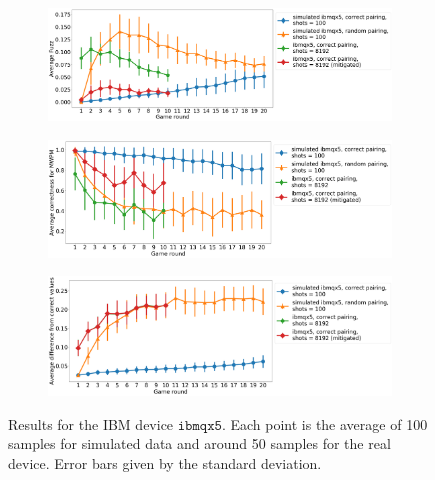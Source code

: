 \documentclass[aps,prl,twocolumn,showpacs,preprintnumbers]{revtex4-1}
\begin{document}
\begin{figure}
    \centering
    \begin{subfigure}[b]{\textwidth}
        \includegraphics[width=\textwidth]{figures/ibmqx5_fuzz.png}
    \end{subfigure}
    \begin{subfigure}[b]{\textwidth}
        \includegraphics[width=\textwidth]{figures/ibmqx5_mwpm.png}
    \end{subfigure}
    \begin{subfigure}[b]{\textwidth}
        \includegraphics[width=\textwidth]{figures/ibmqx5_diff.png}
    \end{subfigure}
    \caption{Results for the IBM device $\mathtt{ibmqx5}$. Each point is the average of 100 samples for simulated data and around 50 samples for the real device. Error bars given by the standard deviation.}\label{fig:ibmqx5}
\end{figure}
\pagebreak
\end{document}
